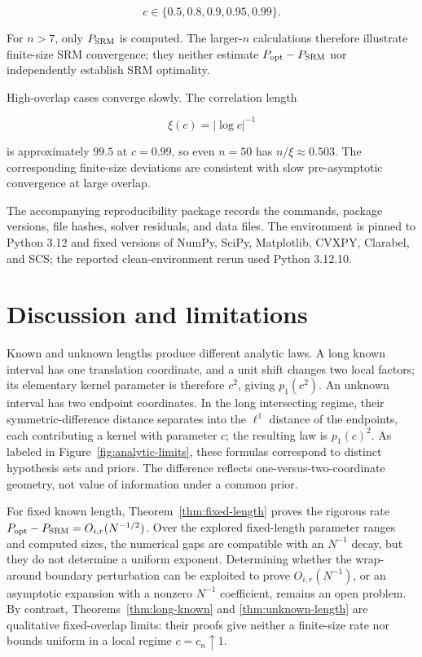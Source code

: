 \[
c\in\{0.5,0.8,0.9,0.95,0.99\}.
\]

For \(n>7\), only \(P_{\rm SRM}\) is computed. The larger-\(n\) calculations
therefore illustrate finite-size SRM convergence; they neither estimate
\(P_{\rm opt}-P_{\rm SRM}\) nor independently establish SRM optimality.

High-overlap cases converge slowly. The correlation length

\[
\xi(c)=|\log c|^{-1}
\]

is approximately \(99.5\) at \(c=0.99\), so even \(n=50\) has
\(n/\xi\approx0.503\). The corresponding finite-size deviations are
consistent with slow pre-asymptotic convergence at large overlap.

The accompanying reproducibility package records the commands, package
versions, file hashes, solver residuals, and data files. The environment is
pinned to Python 3.12 and fixed versions of NumPy, SciPy, Matplotlib, CVXPY,
Clarabel, and SCS; the reported clean-environment rerun used Python 3.12.10.

\FloatBarrier

\section{Discussion and limitations}\label{discussion-and-limitations}

Known and unknown lengths produce different analytic laws. A long known
interval has one translation coordinate, and a unit shift changes two local
factors; its elementary kernel parameter is therefore \(c^2\), giving
\(p_1(c^2)\). An unknown interval has two endpoint coordinates. In the long
intersecting regime, their symmetric-difference distance separates into the
\(\ell^1\) distance of the endpoints, each contributing a kernel with
parameter \(c\); the resulting law is \(p_1(c)^2\). As labeled in
Figure~\ref{fig:analytic-limits}, these formulas correspond to distinct
hypothesis sets and priors. The difference reflects one-versus-two-coordinate
geometry, not value of information under a common prior.

For fixed known length, Theorem~\ref{thm:fixed-length} proves the rigorous rate
\(P_{\rm opt}-P_{\rm SRM}=O_{i,r}(N^{-1/2})\). Over the explored fixed-length
parameter ranges and computed sizes, the numerical gaps are compatible with an
\(N^{-1}\) decay, but they do not determine a uniform exponent. Determining
whether the wrap-around boundary perturbation can be exploited to prove
\(O_{i,r}(N^{-1})\), or an asymptotic expansion with a nonzero \(N^{-1}\)
coefficient, remains an open problem. By contrast,
Theorems~\ref{thm:long-known} and \ref{thm:unknown-length} are qualitative
fixed-overlap limits: their proofs give neither a finite-size rate nor bounds
uniform in a local regime \(c=c_n\uparrow1\).

